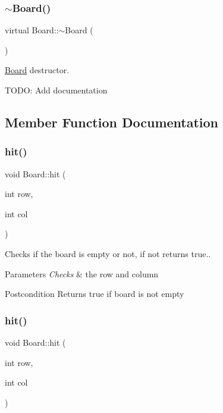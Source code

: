 \subsubsection{\texorpdfstring{$\sim$Board()}{~Board()}}
{\footnotesize\ttfamily virtual Board\+::$\sim$\+Board (\begin{DoxyParamCaption}{ }\end{DoxyParamCaption})\hspace{0.3cm}{\ttfamily [virtual]}}



\mbox{\hyperlink{classBoard}{Board}} destructor. 

T\+O\+DO\+: Add documentation 

\subsection{Member Function Documentation}
\mbox{\label{classBoard_abbbcf159450dc2114a00936452b15cad}} 
\subsubsection{\texorpdfstring{hit()}{hit()}\hspace{0.1cm}{\footnotesize\ttfamily [1/2]}}
{\footnotesize\ttfamily void Board\+::hit (\begin{DoxyParamCaption}\item[{int}]{row,  }\item[{int}]{col }\end{DoxyParamCaption})}



Checks if the board is empty or not, if not returns true.. 


\begin{DoxyParams}{Parameters}
{\em Checks} & the row and column \\
\hline
\end{DoxyParams}
\begin{DoxyPostcond}{Postcondition}
Returns true if board is not empty 
\end{DoxyPostcond}
\mbox{\label{classBoard_abbbcf159450dc2114a00936452b15cad}} 
\subsubsection{\texorpdfstring{hit()}{hit()}\hspace{0.1cm}{\footnotesize\ttfamily [2/2]}}
{\footnotesize\ttfamily void Board\+::hit (\begin{DoxyParamCaption}\item[{int}]{row,  }\item[{int}]{col }\end{DoxyParamCaption})}

